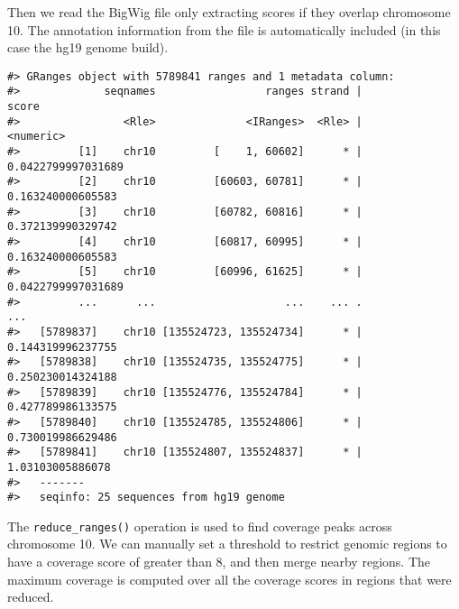 \documentclass[10pt,letterpaper]{article}
\newenvironment{Shaded}{\begin{snugshade}}{\end{snugshade}}
\newcommand{\KeywordTok}[1]{\textcolor[rgb]{0.13,0.29,0.53}{\textbf{#1}}}
\newcommand{\DataTypeTok}[1]{\textcolor[rgb]{0.13,0.29,0.53}{#1}}
\newcommand{\DecValTok}[1]{\textcolor[rgb]{0.00,0.00,0.81}{#1}}
\newcommand{\StringTok}[1]{\textcolor[rgb]{0.31,0.60,0.02}{#1}}
\newcommand{\OperatorTok}[1]{\textcolor[rgb]{0.81,0.36,0.00}{\textbf{#1}}}
\newcommand{\NormalTok}[1]{#1}
\begin{document}
Then we read the BigWig file only extracting scores if they overlap
chromosome 10. The annotation information from the file is automatically
included (in this case the hg19 genome build).

\begin{Shaded}
\end{Shaded}

\begin{verbatim}
#> GRanges object with 5789841 ranges and 1 metadata column:
#>             seqnames                 ranges strand |              score
#>                <Rle>              <IRanges>  <Rle> |          <numeric>
#>         [1]    chr10         [    1, 60602]      * | 0.0422799997031689
#>         [2]    chr10         [60603, 60781]      * |  0.163240000605583
#>         [3]    chr10         [60782, 60816]      * |  0.372139990329742
#>         [4]    chr10         [60817, 60995]      * |  0.163240000605583
#>         [5]    chr10         [60996, 61625]      * | 0.0422799997031689
#>         ...      ...                    ...    ... .                ...
#>   [5789837]    chr10 [135524723, 135524734]      * |  0.144319996237755
#>   [5789838]    chr10 [135524735, 135524775]      * |  0.250230014324188
#>   [5789839]    chr10 [135524776, 135524784]      * |  0.427789986133575
#>   [5789840]    chr10 [135524785, 135524806]      * |  0.730019986629486
#>   [5789841]    chr10 [135524807, 135524837]      * |   1.03103005886078
#>   -------
#>   seqinfo: 25 sequences from hg19 genome
\end{verbatim}

The \texttt{reduce\_ranges()} operation is used to find coverage peaks
across chromosome 10. We can manually set a threshold to restrict
genomic regions to have a coverage score of greater than 8, and then
merge nearby regions. The maximum coverage is computed over all the
coverage scores in regions that were reduced.

\begin{Shaded}
\end{Shaded}
\end{document}
